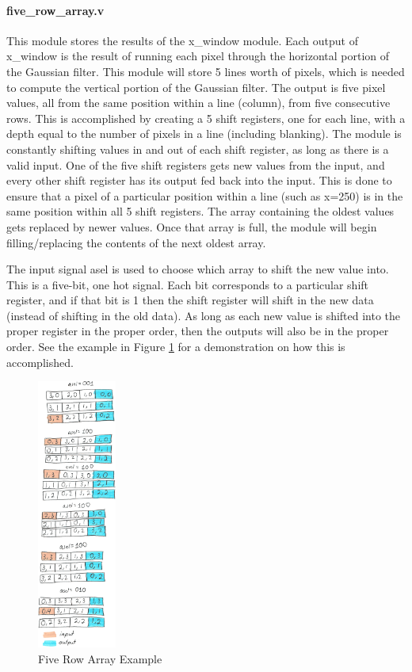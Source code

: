\paragraph{five\_row\_array.v}
This module stores the results of the x\_window module. Each output of x\_window 
is the result of running each pixel through the horizontal portion of the 
Gaussian filter. This module will store 5 lines worth of pixels, which is needed 
to compute the vertical portion of the Gaussian filter. The output is five pixel 
values, all from the same position within a line (column), from five consecutive 
rows. This is accomplished by creating a 5 shift registers, one for each line, 
with a depth equal to the number of pixels in a line (including blanking).
The module is constantly shifting values in and out of each shift register, as 
long as there is a valid input. One of the five shift registers gets new values 
from the input, and every other shift register has its output fed back into the 
input. This is done to ensure that a pixel of a particular position within 
a line (such as x=250) is in the same position within all 5 shift registers. The 
array containing the oldest values gets replaced by newer values. Once that 
array is full, the module will begin filling/replacing the contents of the next 
oldest array.

The input signal asel is used to choose which array to shift the new value into. 
This is a five-bit, one hot signal. Each bit corresponds to a particular 
shift register, and if that bit is 1 then the shift register will shift in the 
new data (instead of shifting in the old data). As long as each new value is 
shifted into the proper register in the proper order, then the outputs will also 
be in the proper order. See the example in Figure \ref{fig:io} for a demonstration 
on how this is accomplished.

\begin{figure}
    \includegraphics[width=0.23\textwidth]{processed_image_pngs/io_diagram.png}
    \caption{Five Row Array Example}
    \label{fig:io}
\end{figure}

